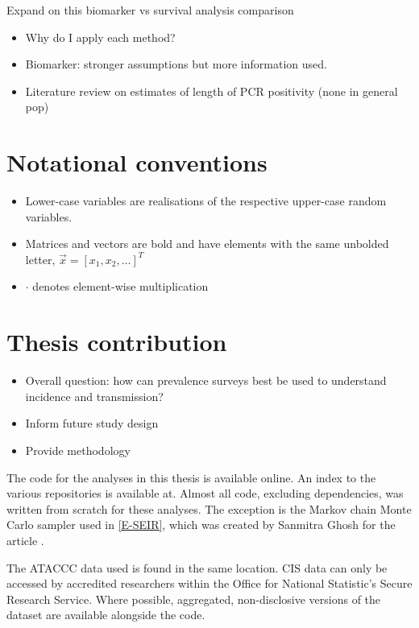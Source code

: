 \documentclass[thesis.tex]{subfiles}
\begin{document}
Expand on this biomarker vs survival analysis comparison
\begin{itemize}
    \item Why do I apply each method?
    \item Biomarker: stronger assumptions but more information used.
    \item Literature review on estimates of length of PCR positivity (none in general pop)
\end{itemize}

\section{Notational conventions}

\begin{itemize}
    \item Lower-case variables are realisations of the respective upper-case random variables.
    \item Matrices and vectors are bold and have elements with the same unbolded letter, \eg $\vec{x} = [x_1, x_2, \dots]^T$
    \item $\cdot$ denotes element-wise multiplication
\end{itemize}


\section{Thesis contribution}

\begin{itemize}
    \item Overall question: how can prevalence surveys best be used to understand incidence and transmission?
    \item Inform future study design
    \item Provide methodology
\end{itemize}

The code for the analyses in this thesis is available online.
An index to the various repositories is available at.
Almost all code, excluding dependencies, was written from scratch for these analyses.
The exception is the Markov chain Monte Carlo sampler used in \cref{E-SEIR}, which was created by Sanmitra Ghosh for the article \textcite{ghoshApproximate}.

The ATACCC data used is found in the same location.
CIS data can only be accessed by accredited researchers within the Office for National Statistic's Secure Research Service.
Where possible, aggregated, non-disclosive versions of the dataset are available alongside the code.
\end{document}
